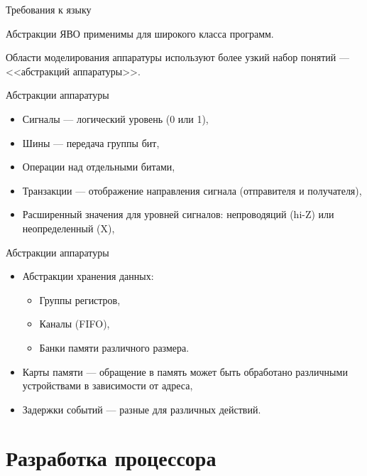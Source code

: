 \begin{frame}{Требования к языку}

Абстракции ЯВО применимы для широкого класса программ.

Области моделирования аппаратуры используют более узкий набор понятий --- <<абстракций аппаратуры>>.

\end{frame}

\begin{frame}{Абстракции аппаратуры}

\begin{itemize}
    \item Сигналы --- логический уровень (0 или 1),
    \item Шины --- передача группы бит,
    \item Операции над отдельными битами,
    \item Транзакции --- отображение направления сигнала (отправителя и получателя),
    \item Расширенный значения для уровней сигналов: непроводяций (hi-Z) или неопределенный (X),
\end{itemize}

\end{frame}

\begin{frame}{Абстракции аппаратуры}

\begin{itemize}
    \item Абстракции хранения данных:
    \begin{itemize}
        \item Группы регистров,
        \item Каналы (FIFO),
        \item Банки памяти различного размера.
    \end{itemize}
    \item Карты памяти --- обращение в память может быть обработано различными устройствами в зависимости от адреса,
    \item Задержки событий --- разные для различных действий.
\end{itemize}

\end{frame}

\section{Разработка процессора}

